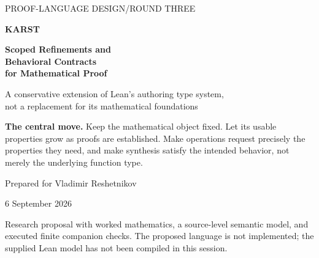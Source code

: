 \documentclass[11pt,letterpaper]{article}
\theoremstyle{remark}
\begin{document}
\hypersetup{pageanchor=false}
\begin{titlepage}
\color{ink}
{\sffamily\large PROOF-LANGUAGE DESIGN\quad /\quad ROUND THREE\par}
\vspace{1.0in}
{\sffamily\bfseries\fontsize{46}{49}\selectfont KARST\par}
\vspace{.23in}
{\sffamily\bfseries\fontsize{25}{30}\selectfont Scoped Refinements and\\Behavioral Contracts\\for Mathematical Proof\par}
\vspace{.35in}
{\large A conservative extension of Lean's authoring type system,\\not a replacement for its mathematical foundations\par}
\vfill
\begin{decisionbox}
\textbf{The central move.} Keep the mathematical object fixed. Let its usable
properties grow as proofs are established. Make operations request precisely
the properties they need, and make synthesis satisfy the intended behavior,
not merely the underlying function type.
\end{decisionbox}
\vspace{.22in}
Prepared for Vladimir Reshetnikov\par
6 September 2026\par
\vspace{.15in}
{\small\color{muted}Research proposal with worked mathematics, a source-level
semantic model, and executed finite companion checks. The proposed language is
not implemented; the supplied Lean model has not been compiled in this session.}
\end{titlepage}
\hypersetup{pageanchor=true}
\end{document}
